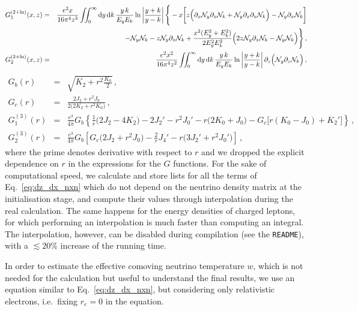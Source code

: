 \documentclass[notitlepage,showpacs,preprintnumbers,amsmath,amssymb,superscriptaddress,prd,onecolumn]{revtex4-1}
\begin{document}
\begin{eqnarray}
G_1^{(2+\ln)}(x,z)
&=&
\frac{e^2 x}{16\pi^4 z^3}
\int\!\!\!\int_0^\infty
{\rm d}y\,
{\rm d}k\,
\frac{y\,k}{E_y E_k}
\ln\left|\frac{y+k}{y-k}\right|
\Bigg\{
-x\bigg[
  z\Big(
    \partial_x\mathcal{N}_y\partial_z\mathcal{N}_k
    +
    \mathcal{N}_y\partial_x\partial_z\mathcal{N}_k
  \Big)
  -\mathcal{N}_y\partial_x\mathcal{N}_k
\bigg]
\nonumber\\
&&
\qquad\qquad\qquad\qquad
-\mathcal{N}_y\mathcal{N}_k
-z\mathcal{N}_y\partial_z\mathcal{N}_k
+\frac{x^2 (E_y^2+E_k^2)}{2 E_y^2 E_k^2}
\Big(
2z \mathcal{N}_y\partial_z \mathcal{N}_k
-\mathcal{N}_y \mathcal{N}_k
\Big)
\Bigg\}
\,,\\
G_2^{(2+\ln)}(x,z)
&=&
\frac{e^2 x^2}{16\pi^4 z^2}
\int\!\!\!\int_0^\infty
{\rm d}y\,
{\rm d}k\,
\frac{y\,k}{E_y E_k}
\ln\left|\frac{y+k}{y-k}\right|
\partial_z
\Big(
\mathcal{N}_y
\partial_z
\mathcal{N}_k
\Big)
\,,
\end{eqnarray}
%
\begin{eqnarray}
G_b(r)
&=&
\sqrt{K_2 + r^2 \frac{K_0}{2}}
\,,\\
G_c(r)
&=&
\frac{2J_2 + r^2 J_0}{2\Big(2K_2 + r^2 K_0\Big)}
\,,\\
G_1^{(3)}(r)
&=&
\frac{e^3}{4\pi} G_b
\left\{
 \frac{1}{r}\Big(2J_2-4K_2\Big)
 -2J_2'
 -r^2J_0'
 -r\Big(2K_0+J_0\Big)
 -G_c\Big[r(K_0-J_0)+K_2'\Big]
\right\}
\,,\\
G_2^{(3)}(r)
&=&
\frac{e^3}{4\pi} G_b
\left[
 G_c \Big(2J_2 + r^2 J_0\Big)
 -\frac{2}{r}J_4'
 -r\Big(3J_2'+r^2J_0'\Big)
\right]
\,,
\label{eq:g3}
\end{eqnarray}
%
where the prime denotes derivative with respect to $r$ and we dropped the explicit dependence on $r$ in the expressions for the $G$ functions.
For the sake of computational speed, we calculate and store lists for all the terms of Eq.~\eqref{eq:dz_dx_nxn}
which do not depend on the neutrino density matrix 
at the initialisation stage, and compute their values through interpolation during the real calculation.
The same happens for the energy densities of charged leptons, for which performing an interpolation
is much faster than computing an integral.
The interpolation, however, can be disabled during compilation (see the \texttt{README}),
with a $\lesssim20$\% increase of the running time.

In order to estimate the effective comoving neutrino temperature $w$, which is
not needed for the calculation but useful to understand the final results,
we use an equation similar to Eq.~\eqref{eq:dz_dx_nxn},
but considering only relativistic electrons, i.e.\ fixing $r_e=0$ in the equation.
\end{document}
